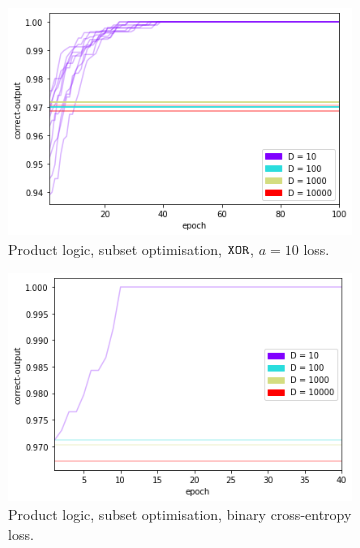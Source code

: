 \begin{figure}[h]
    \centering
    \begin{subfigure}[t]{0.30\textwidth}
        \centering
        \includegraphics[width=\textwidth]{imgs/conj-co-prod-keep50-5t.png}
        \caption{Product logic, subset optimisation, $\texttt{XOR}$, $a=10$ loss.}
        \label{fig:conjconvcopxor}
    \end{subfigure}
    \begin{subfigure}[t]{0.30\textwidth}
        \centering
        \includegraphics[width=\textwidth]{imgs/conj-co-prod-keep50-5t-bce.png}
        \caption{Product logic, subset optimisation, binary cross-entropy loss.}
        \label{fig:conjconvcopbce}
    \end{subfigure}
    \begin{subfigure}[t]{0.30\textwidth}
        \centering

\end{subfigure}
\end{figure}
